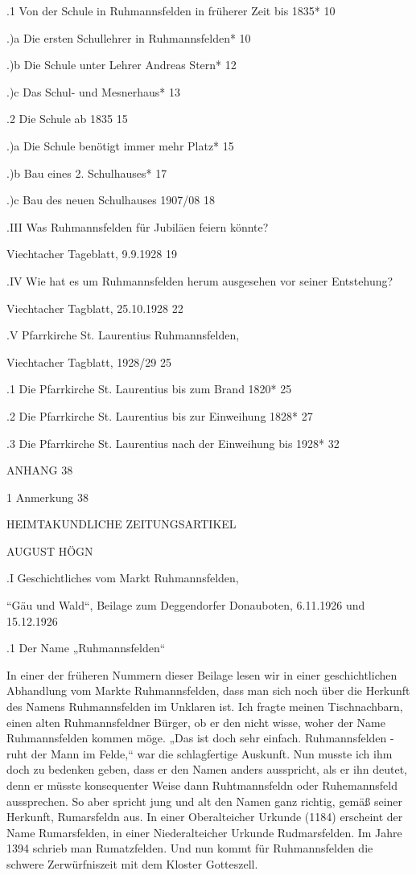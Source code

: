 \documentclass[12pt,a4paper]{book}
\begin{document}
.1 Von der Schule in Ruhmannsfelden in früherer Zeit bis 1835*  10

.)a Die ersten Schullehrer in Ruhmannsfelden*   10

.)b Die Schule unter Lehrer Andreas Stern*  12

.)c Das Schul- und Mesnerhaus*  13

.2 Die Schule ab 1835   15

.)a Die Schule benötigt immer mehr Platz*   15

.)b Bau eines 2. Schulhauses*   17

.)c Bau des neuen Schulhauses 1907/08   18

.III Was Ruhmannsfelden für Jubiläen feiern könnte?

Viechtacher Tageblatt, 9.9.1928 19

.IV Wie hat es um Ruhmannsfelden herum ausgesehen vor seiner Entstehung?

Viechtacher Tagblatt, 25.10.1928    22

.V Pfarrkirche St. Laurentius Ruhmannsfelden,

Viechtacher Tagblatt, 1928/29   25

.1 Die Pfarrkirche St. Laurentius bis zum Brand 1820*   25

.2 Die Pfarrkirche St. Laurentius bis zur Einweihung 1828*  27

.3 Die Pfarrkirche St. Laurentius nach der Einweihung bis 1928* 32

ANHANG  38

1 Anmerkung 38



HEIMTAKUNDLICHE ZEITUNGSARTIKEL

AUGUST HÖGN

.I Geschichtliches vom Markt Ruhmannsfelden,

“Gäu und Wald“, Beilage zum Deggendorfer Donauboten, 6.11.1926 und 15.12.1926

.1 Der Name „Ruhmannsfelden“

In einer der früheren Nummern dieser Beilage lesen wir in einer geschichtlichen
Abhandlung vom Markte Ruhmannsfelden, dass man sich noch über die Herkunft des
Namens Ruhmannsfelden im Unklaren ist. Ich fragte meinen Tischnachbarn, einen
alten Ruhmannsfeldner Bürger, ob er den nicht wisse, woher der Name
Ruhmannsfelden kommen möge. „Das ist doch sehr einfach. Ruhmannsfelden - ruht
der Mann im Felde,“ war die schlagfertige Auskunft. Nun musste ich ihm doch zu
bedenken geben, dass er den Namen anders ausspricht, als er ihn deutet, denn er
müsste konsequenter Weise dann Ruhtmannsfeldn oder Ruhemannsfeld aussprechen. So
aber spricht jung und alt den Namen ganz richtig, gemäß seiner Herkunft,
Rumarsfeldn aus. In einer Oberalteicher Urkunde (1184) erscheint der Name
Rumarsfelden, in einer Niederalteicher Urkunde Rudmarsfelden. Im Jahre 1394
schrieb man Rumatzfelden. Und nun kommt für Ruhmannsfelden die schwere
Zerwürfniszeit mit dem Kloster Gotteszell.
\end{document}
